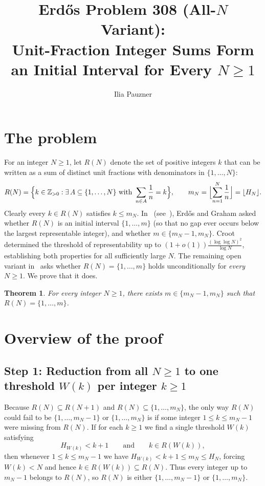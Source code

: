 \documentclass[11pt,a4paper]{amsart}
\title[Erd\H{o}s Problem 308 (All-$N$ Variant)]{\texorpdfstring{Erd\H{o}s Problem 308 (All-$N$ Variant):\\ Unit-Fraction Integer Sums Form an Initial Interval for Every $N \ge 1$}{Erdos Problem 308 (All-N Variant): Unit-Fraction Integer Sums Form an Initial Interval for Every N >= 1}}
\author{Ilia Pauzner}
\date{}
\newtheorem*{theorem}{Theorem}
\theoremstyle{remark}
\begin{document}
\maketitle

\section{The problem}

For an integer $N \ge 1$, let $R(N)$ denote the set of positive integers $k$ that can be written as a sum of distinct unit fractions with denominators in $\{1, \dots, N\}$:
\[
R(N) = \Bigl\{ k \in \mathbb{Z}_{> 0} : \exists\, A \subseteq \{1, \dots, N\} \text{ with } \sum_{n \in A} \frac{1}{n} = k \Bigr\},
\qquad
m_N = \Bigl\lfloor \sum_{n=1}^N \frac{1}{n} \Bigr\rfloor = \lfloor H_N \rfloor.
\]
Clearly every $k \in R(N)$ satisfies $k \le m_N$. In~\cite[p.~37]{ErGr80} (see~\cite{EP308, FC308}), Erd\H{o}s and Graham asked whether $R(N)$ is an initial interval $\{1, \dots, m\}$ (so that no gap ever occurs below the largest representable integer), and whether $m \in \{m_N - 1, m_N\}$. Croot~\cite{Cr99} determined the threshold of representability up to $(1 + o(1)) \frac{(\log \log N)^2}{\log N}$, establishing both properties for all sufficiently large $N$. The remaining open variant in~\cite{FC308} asks whether $R(N) = \{1, \dots, m\}$ holds unconditionally for \emph{every} $N \ge 1$. We prove that it does.

\begin{theorem}
For every integer $N \ge 1$, there exists $m \in \{m_N - 1, m_N\}$ such that $R(N) = \{1, \dots, m\}$.
\end{theorem}

\section{Overview of the proof}

\subsection*{\texorpdfstring{Step 1: Reduction from all $N \ge 1$ to one threshold $W(k)$ per integer $k \ge 1$}{Step 1: Reduction from all N >= 1 to one threshold W(k) per integer k >= 1}}
Because $R(N) \subseteq R(N + 1)$ and $R(N) \subseteq \{1, \dots, m_N\}$, the only way $R(N)$ could fail to be $\{1, \dots, m_N - 1\}$ or $\{1, \dots, m_N\}$ is if some integer $1 \le k \le m_N - 1$ were missing from $R(N)$. If for each $k \ge 1$ we find a single threshold $W(k)$ satisfying
\[
H_{W(k)} < k + 1 \qquad\text{and}\qquad k \in R(W(k)),
\]
then whenever $1 \le k \le m_N - 1$ we have $H_{W(k)} < k + 1 \le m_N \le H_N$, forcing $W(k) < N$ and hence $k \in R(W(k)) \subseteq R(N)$. Thus every integer up to $m_N - 1$ belongs to $R(N)$, so $R(N)$ is either $\{1, \dots, m_N - 1\}$ or $\{1, \dots, m_N\}$.
\end{document}
